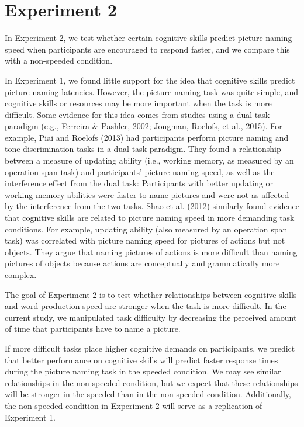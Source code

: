 \documentclass[
  man,floatsintext]{apa6}
\begin{document}
\hypertarget{experiment-2}{%
\section{Experiment 2}\label{experiment-2}}

In Experiment 2, we test whether certain cognitive skills predict picture naming speed when participants are encouraged to respond faster, and we compare this with a non-speeded condition.

In Experiment 1, we found little support for the idea that cognitive skills predict picture naming latencies. However, the picture naming task was quite simple, and cognitive skills or resources may be more important when the task is more difficult. Some evidence for this idea comes from studies using a dual-task paradigm (e.g., Ferreira \& Pashler, 2002; Jongman, Roelofs, et al., 2015). For example, Piai and Roelofs (2013) had participants perform picture naming and tone discrimination tasks in a dual-task paradigm. They found a relationship between a measure of updating ability (i.e., working memory, as measured by an operation span task) and participants' picture naming speed, as well as the interference effect from the dual task: Participants with better updating or working memory abilities were faster to name pictures and were not as affected by the interference from the two tasks. Shao et al. (2012) similarly found evidence that cognitive skills are related to picture naming speed in more demanding task conditions. For example, updating ability (also measured by an operation span task) was correlated with picture naming speed for pictures of actions but not objects. They argue that naming pictures of actions is more difficult than naming pictures of objects because actions are conceptually and grammatically more complex.

The goal of Experiment 2 is to test whether relationships between cognitive skills and word production speed are stronger when the task is more difficult. In the current study, we manipulated task difficulty by decreasing the perceived amount of time that participants have to name a picture.

If more difficult tasks place higher cognitive demands on participants, we predict that better performance on cognitive skills will predict faster response times during the picture naming task in the speeded condition. We may see similar relationships in the non-speeded condition, but we expect that these relationships will be stronger in the speeded than in the non-speeded condition. Additionally, the non-speeded condition in Experiment 2 will serve as a replication of Experiment 1.
\end{document}
